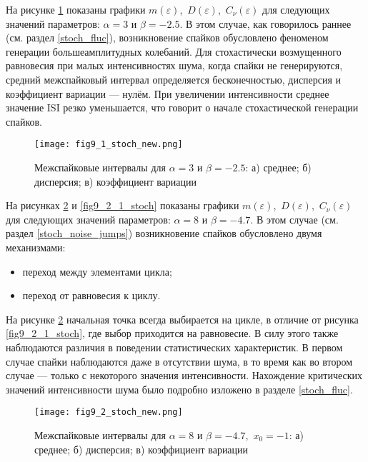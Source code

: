 \documentclass[a4paper, 14pt]{extreport}
\numberwithin{equation}{section}
\numberwithin{figure}{section}
\numberwithin{table}{section}
\begin{document}
				На рисунке \ref{fig9_1_stoch} показаны графики $ m(\varepsilon) $,~$ D(\varepsilon) $,~$ C_{\nu}(\varepsilon) $ для следующих значений параметров: $ \alpha = 3 $ и $ \beta = -2.5 $. В этом случае, как говорилось раннее (см. раздел \ref{stoch_fluc}), возникновение спайков обусловлено феноменом генерации большеамплитудных колебаний. Для стохастически возмущенного равновесия при малых интенсивностях шума, когда спайки не генерируются, средний межспайковый интервал определяется бесконечностью, дисперсия и коэффициент вариации --- нулём. При увеличении интенсивности среднее значение ISI резко уменьшается, что говорит о начале стохастической генерации спайков.
				\begin{figure}[h!]
					\begin{center}
						\texttt{[image: fig9\_1\_stoch\_new.png]}
					\end{center}
					\caption{Межспайковые интервалы для $ \alpha = 3$ и $ \beta = -2.5$: а) среднее; б) дисперсия; в) коэффициент вариации}
					\label{fig9_1_stoch}		
				\end{figure} %

				На рисунках \ref{fig9_2_stoch} и \ref{fig9_2_1_stoch} показаны графики $ m(\varepsilon) $,~$ D(\varepsilon) $,~$ C_{\nu}(\varepsilon) $ для следующих значений параметров: $ \alpha = 8 $ и $ \beta = -4.7 $. В этом случае (см. раздел \ref{stoch_noise_jumps}) возникновение спайков обусловлено двумя механизмами:
                \begin{itemize}
                	\item переход между элементами цикла;
                    \item переход от равновесия к циклу.
                \end{itemize}

                На рисунке \ref{fig9_2_stoch} начальная точка всегда выбирается на цикле, в отличие от рисунка \ref{fig9_2_1_stoch}, где выбор приходится на равновесие. В силу этого также наблюдаются различия в поведении статистических характеристик. В первом случае спайки наблюдаются даже в отсутствии шума, в то время как во втором случае --- только с некоторого значения интенсивности. Нахождение критических значений интенсивности шума было подробно изложено в разделе \ref{stoch_fluc}.
				\begin{figure}[h!]
					\begin{center}
						\texttt{[image: fig9\_2\_stoch\_new.png]}
					\end{center}
					\caption{Межспайковые интервалы для $ \alpha = 8$ и $ \beta = -4.7$,~$ x_{0} = -1$: а) среднее; б) дисперсия; в) коэффициент вариации}
					\label{fig9_2_stoch}		
				\end{figure} %
\end{document}
